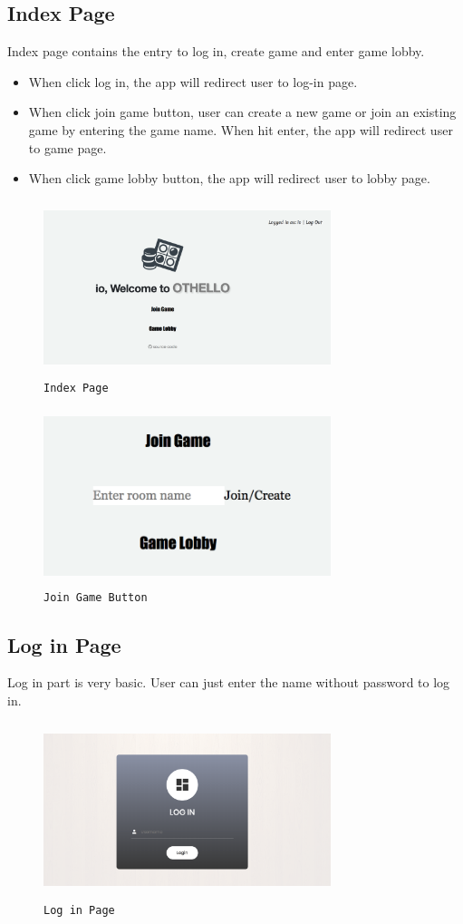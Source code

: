 \subsection{Index Page}
Index page contains the entry to log in, create game and enter game lobby.
\begin{itemize}
\item When click log in, the app will redirect user to log-in page.
\item When click join game button, user can create a new game or join an 
existing game by entering the game name. When hit enter, the app will redirect
user to game page.
\item When click game lobby button, the app will redirect user to lobby page.
\end{itemize}
\begin{figure}[!htb]
\includegraphics[height=2.0in, width=3.3in]{index.png}
\caption{\texttt{Index Page}}
\end{figure}
\begin{figure}[!htb]
\includegraphics[height=2.0in, width=3.3in]{index2.png}
\caption{\texttt{Join Game Button}}
\end{figure}

\subsection{Log in Page}
Log in part is very basic. User can just enter the name without password to 
log in.
\begin{figure}[!htb]
\includegraphics[height=2.0in, width=3.3in]{login.png}
\caption{\texttt{Log in Page}}
\end{figure}

